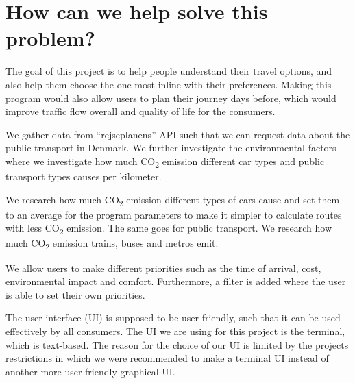 \section{How can we help solve this problem?}\label{sec:how-can-we-help-solve-this-problem?}

The goal of this project is to help people understand their travel options, and also help them choose the one most
inline with their preferences.
Making this program would also allow users to plan their journey days before, which would improve traffic flow
overall and quality of life for the consumers.

We gather data from ``rejseplanens'' API such that we can request data about the public transport in Denmark.
We further investigate the environmental factors where we investigate how much \unit{CO_{2}} emission
different car types and public transport types causes per kilometer.

We research how much \unit{CO_{2}} emission different types of cars cause and set them to an average for
the program parameters to make it simpler to calculate routes with less \unit{CO_{2}} emission.
The same goes for public transport.
We research how much \unit{CO_{2}} emission trains, buses and metros emit.

We allow users to make different priorities such as the time of arrival, cost, environmental impact and comfort.
Furthermore, a filter is added where the user is able to set their own priorities.

The user interface (UI) is supposed to be user-friendly, such that it can be used effectively by all
consumers.
The UI we are using for this project is the terminal, which is text-based.
The reason for the choice of our UI is limited by the projects restrictions in which we were recommended to make a
terminal UI instead of another more user-friendly graphical UI\@.
